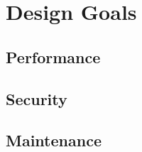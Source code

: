 \section{Design Goals} \label{sec:goal}
\subsection{Performance}
\subsection{Security}
\subsection{Maintenance}


%
